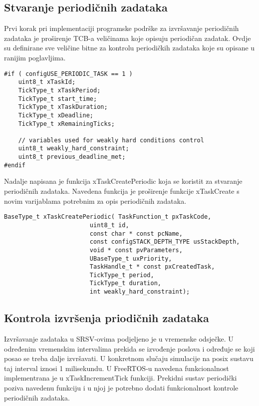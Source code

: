 \documentclass[../zavrsni.tex]{subfiles}
\begin{document}
\subsection{Stvaranje periodičnih zadataka}

Prvi korak pri implementaciji programske podrške za izvršavanje periodičnih zadataka je proširenje TCB-a veličinama koje opisuju 
periodičan zadatak. Ovdje su definirane sve veličine bitne za kontrolu periodičkih zadataka koje su opisane u ranijim poglavljima.

\begin{lstlisting}[style=CStyle,caption={Varijable dodane u strukturu za kontrolu zadataka},captionpos=b]
#if ( configUSE_PERIODIC_TASK == 1 )
    uint8_t xTaskId;
    TickType_t xTaskPeriod;
    TickType_t start_time;
    TickType_t xTaskDuration;
    TickType_t xDeadline;
    TickType_t xRemainingTicks;
    
    // variables used for weakly hard conditions control
    uint8_t weakly_hard_constraint;
    uint8_t previous_deadline_met;
#endif
\end{lstlisting}

Nadalje napisana je funkcija xTaskCreatePeriodic koja se koristit za stvaranje periodičnih zadataka.
Navedena funkcija je proširenje funkcije xTaskCreate s novim varijablama potrebnim za opis periodičnih zadataka.

\begin{lstlisting}[style=CStyle,caption={Prototip funkcije xTaskCreatePeriodic},captionpos=b]
BaseType_t xTaskCreatePeriodic( TaskFunction_t pxTaskCode,
                        uint8_t id,
                        const char * const pcName, 
                        const configSTACK_DEPTH_TYPE usStackDepth,
                        void * const pvParameters,
                        UBaseType_t uxPriority,
                        TaskHandle_t * const pxCreatedTask,
                        TickType_t period,
                        TickType_t duration,
                        int weakly_hard_constraint);
\end{lstlisting} 

\subsection{Kontrola izvršenja priodičnih zadataka}

Izvršavanje zadataka u SRSV-ovima podjeljeno je u vremenske odsječke. U određenim vremenskim intervalima prekida se izvođenje poslova i 
određuje se koji posao se treba dalje izvršavati. U konkretnom slučaju simulacije na posix sustavu taj interval iznosi 1 milisekundu.
U FreeRTOS-u navedena funkcionalnost implementrana je u xTaskIncrementTick funkciji. Prekidni sustav periodički poziva navedenu funkciju 
i u njoj je potrebno dodati funkcionalnost kontrole periodičnih zadataka.
\end{document}
